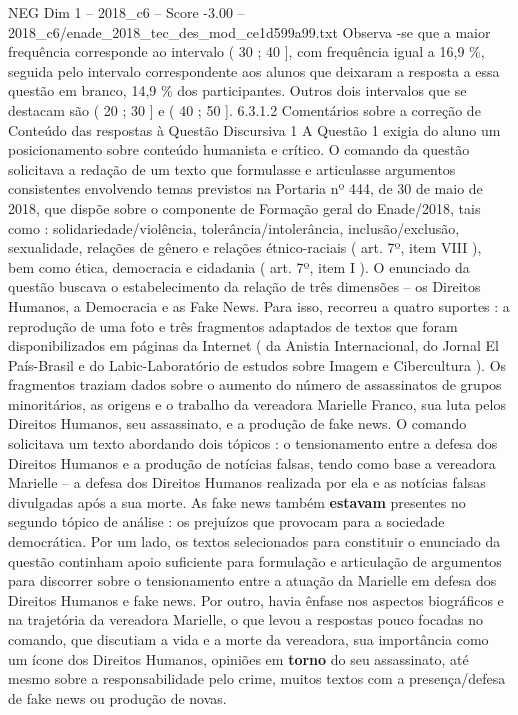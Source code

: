 \begin{textsample}{NEG Dim 1 – 2018\_c6 – Score -3.00 – 2018\_c6/enade\_2018\_tec\_des\_mod\_ce1d599a99.txt}
Observa -se que a maior frequência corresponde ao intervalo ( 30 ; 40 ], com frequência igual a 16,9 \%, seguida pelo intervalo correspondente aos alunos que deixaram a resposta a essa questão em branco, 14,9 \% dos participantes.
Outros dois intervalos que se destacam são ( 20 ; 30 ] e ( 40 ; 50 ]. 6.3.1.2 Comentários sobre a correção de Conteúdo das respostas à Questão Discursiva 1 A Questão 1 exigia do aluno um posicionamento sobre conteúdo humanista e crítico.
O comando da questão solicitava a redação de um texto que formulasse e articulasse argumentos consistentes envolvendo temas previstos na Portaria nº 444, de 30 de maio de 2018, que dispõe sobre o componente de Formação geral do Enade/2018, tais como : solidariedade/violência, tolerância/intolerância, inclusão/exclusão, sexualidade, relações de gênero e relações étnico-raciais ( art. 7º, item VIII ), bem como ética, democracia e cidadania ( art. 7º, item I ).
O enunciado da questão buscava o estabelecimento da relação de três dimensões – os Direitos Humanos, a Democracia e as Fake News.
Para isso, recorreu a quatro suportes : a reprodução de uma foto e três fragmentos adaptados de textos que foram disponibilizados em páginas da Internet ( da Anistia Internacional, do Jornal El País-Brasil e do Labic-Laboratório de estudos sobre Imagem e Cibercultura ).
Os fragmentos traziam dados sobre o aumento do número de assassinatos de grupos minoritários, as origens e o trabalho da vereadora Marielle Franco, sua luta pelos Direitos Humanos, seu assassinato, e a produção de fake news.
O comando solicitava um texto abordando dois tópicos : o tensionamento entre a defesa dos Direitos Humanos e a produção de notícias falsas, tendo como base a vereadora Marielle – a defesa dos Direitos Humanos realizada por ela e as notícias falsas divulgadas após a sua morte.
As fake news também \textbf{estavam} presentes no segundo tópico de análise : os prejuízos que provocam para a sociedade democrática.
Por um lado, os textos selecionados para constituir o enunciado da questão continham apoio suficiente para formulação e articulação de argumentos para discorrer sobre o tensionamento entre a atuação da Marielle em defesa dos Direitos Humanos e fake news.
Por outro, havia ênfase nos aspectos biográficos e na trajetória da vereadora Marielle, o que levou a respostas pouco focadas no comando, que discutiam a vida e a morte da vereadora, sua importância como um ícone dos Direitos Humanos, opiniões em \textbf{torno} do seu assassinato, até mesmo sobre a responsabilidade pelo crime, muitos textos com a presença/defesa de fake news ou produção de novas.

\end{textsample}
